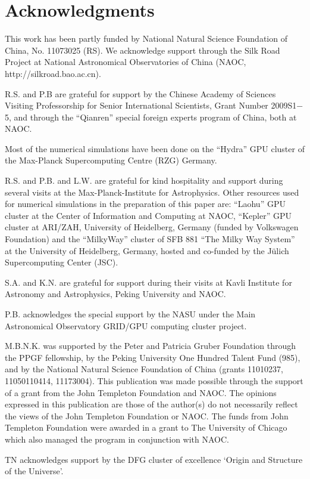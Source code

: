 \documentclass[usenatbib,aas_macros]{mn2e}
\begin{document}
\section*{Acknowledgments}
This work has been partly funded by National Natural Science Foundation of China, No. 11073025 (RS).
We acknowledge support through the Silk Road Project at National Astronomical Observatories of China (NAOC, http://silkroad.bao.ac.cn).

R.S. and P.B are grateful for support by the Chinese Academy of Sciences Visiting Professorship for Senior International Scientists, Grant Number 2009S1$-$5, and through the ``Qianren'' special foreign experts program of China, both at NAOC.

Most of the numerical simulations have been done on the ``Hydra'' GPU cluster of the Max-Planck Supercomputing Centre (RZG) Germany.

R.S. and P.B. and L.W. are grateful for kind hospitality and support during several visits at the Max-Planck-Institute for Astrophysics.
Other resources used for numerical simulations in the preparation of this paper are:
``Laohu'' GPU cluster at the Center of Information and Computing at NAOC, ``Kepler'' GPU cluster at ARI/ZAH, University of Heidelberg, Germany (funded by Volkswagen Foundation) and the ``MilkyWay'' cluster of SFB 881 “The Milky Way System” at the University of Heidelberg, Germany, hosted and co-funded by the J\"ulich Supercomputing Center (JSC).

S.A. and K.N. are grateful for support during their visits at Kavli Institute for Astronomy and Astrophysics, Peking University and NAOC.

P.B. acknowledges the special support by the NASU under the Main Astronomical Observatory GRID/GPU computing cluster project. 

M.B.N.K. was supported by the Peter and Patricia Gruber Foundation through the PPGF fellowship, by the Peking University One Hundred Talent Fund (985), and by the National Natural Science Foundation of China (grants 11010237, 11050110414, 11173004). 
This publication was made possible through the support of a grant from the John Templeton Foundation and NAOC.
The opinions expressed in this publication are those of the author(s) do not necessarily reflect the views of the John Templeton Foundation or NAOC. 
The funds from John Templeton Foundation were awarded in a grant to The University of Chicago which also managed the program in conjunction with NAOC.

TN acknowledges support by the DFG cluster of excellence ‘Origin and Structure of the Universe’.
\end{document}
